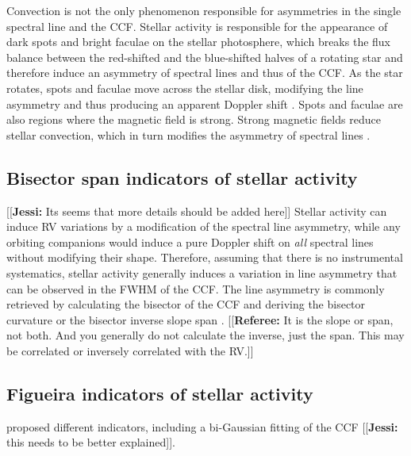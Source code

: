 \documentclass[11pt, oneside]{article}
\newcommand{\jessi}[1]{{\color{Purple}[[\textbf{Jessi: }#1]]}}
\newcommand{\comment}[1]{{\color{red}[[\textbf{Referee: }#1]]}}
\begin{document}
Convection is not the only phenomenon responsible for asymmetries in the single spectral line and the CCF. Stellar activity is responsible for the appearance of dark spots and bright faculae on the stellar photosphere, which breaks the flux balance between the red-shifted and the blue-shifted halves of a rotating star and therefore induce an asymmetry of spectral lines and thus of the CCF. As the star rotates, spots and faculae move across the stellar disk, modifying the line asymmetry and thus producing an apparent Doppler shift \citep{Saar-1997b,Hatzes-2002,Kurster2003,Desort-2007,Lagrange-2010,Boisse-2012b}. Spots and faculae are also regions where the magnetic field is strong. Strong magnetic fields reduce stellar convection, which in turn modifies the asymmetry of spectral lines \citep[][]{Cavallini-1985a,Dravins-1981,Lindegren-2003,Meunier-2010a,Dumusque-2014b}.



\subsection{Bisector span indicators of stellar activity}
\jessi{Its seems that more details should be added here}
Stellar activity can induce RV variations by a modification of the spectral line asymmetry, while any orbiting companions would induce a pure Doppler shift on \emph{all} spectral lines without modifying their shape.
Therefore, assuming that there is no instrumental systematics, stellar activity generally induces a variation in line asymmetry that can be observed in the  FWHM of the CCF. 
The line asymmetry is commonly retrieved by calculating the bisector of the CCF \citep[][]{Voigt1956} and deriving the bisector curvature \citep[][]{Hatzes1996} or the bisector inverse slope span \citep[BIS SPAN,][]{Queloz-2001}. 
\comment{It is the slope or span, not both. And you generally do not calculate the inverse, just the
span. This may be correlated or inversely correlated with the RV.}


\subsection{Figueira indicators of stellar activity}
\citet{Figueira-2013} proposed different indicators, including a bi-Gaussian fitting of the CCF \jessi{this needs to be better explained}. 


\end{document}
